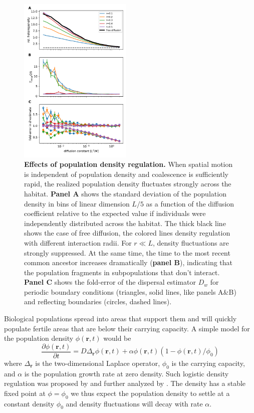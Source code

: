 \documentclass[aps,rmp, twocolumn]{revtex4}
\newcommand{\rvec}{\mathbf{r}}
\begin{document}
\begin{figure}
    \includegraphics[width=0.48\textwidth]{figures/stable_density}
    \caption{\label{fig:density_reg}  {\bf Effects of population density regulation.}
    When spatial motion is independent of population density and coalescence is sufficiently rapid, the realized population density fluctuates strongly across the habitat.
    {\bf Panel A} shows the standard deviation of the population density in bins of linear dimension $L/5$ as a function of the diffusion coefficient relative to the expected value if individuals were independently distributed across the habitat. The thick black line shows the case of free diffusion, the colored lines density regulation with different interaction radii. For $r\ll L$, density fluctuations are strongly suppressed.
    At the same time, the time to the most recent common ancestor increases dramatically ({\bf panel B}), indicating that the population fragments in subpopulations that don't interact.
    {\bf Panel C} shows the fold-error of the dispersal estimator $D_w$ for periodic boundary conditions (triangles, solid lines, like panels A\&B) and reflecting boundaries (circles, dashed lines).
    }
\end{figure}

Biological populations spread into areas that support them and will quickly populate fertile areas that are below their carrying capacity.
A simple model for the population density $\phi(\rvec,t)$ would be
\begin{equation}
    \label{eq:FKPP}
    \frac{\partial \phi(\rvec,t)}{\partial t} = D \Delta_{\rvec} \phi(\rvec,t) + \alpha \phi(\rvec,t)(1-\phi(\rvec,t)/\phi_0)
\end{equation}
where $ \Delta_{\rvec}$ is the two-dimensional Laplace operator, $\phi_0$ is the carrying capacity, and $\alpha$ is the population growth rate at zero density.
Such logistic density regulation was proposed by \citet{bolker_using_1997} and further analyzed by \citet{etheridge_survival_2004}.
The density has a stable fixed point at $\phi=\phi_0$ we thus expect the population density to settle at a constant density $\phi_0$ and density fluctuations will decay with rate $\alpha$.
\end{document}
